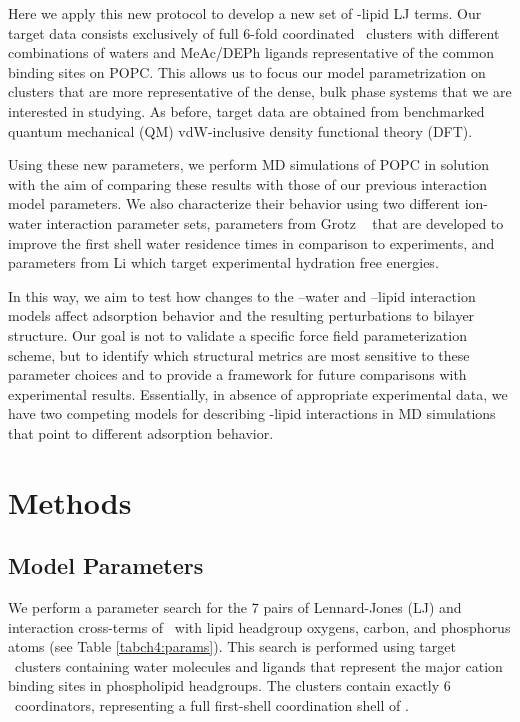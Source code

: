 Here we apply this new protocol to develop a new set of \mg{}-lipid LJ
terms. Our target data consists exclusively of full 6-fold coordinated \mg~clusters with 
different combinations of waters and MeAc/DEPh ligands representative of the common binding sites on POPC.
This allows us to focus our model parametrization on clusters that are more representative of the dense, bulk phase systems that we are interested in studying. 
As before, target data are obtained from benchmarked quantum mechanical (QM) vdW-inclusive density functional theory (DFT).

Using these new parameters, we perform MD simulations of POPC in \mgcl{} solution with the aim of comparing these results
with those of our previous interaction model parameters. We also characterize their behavior using two different
ion-water interaction parameter sets, parameters from Grotz \etal~\cite{grotz:2021:optimized,micro} that are developed to
improve the first shell water residence times in comparison to experiments, and parameters from Li
\etal{}\cite{merzhfe} which target experimental hydration free energies.

In this way, we aim to test how changes to the \mg–water and \mg–lipid interaction models affect adsorption behavior and
the resulting perturbations to bilayer structure. Our goal is not to validate a specific force field parameterization scheme,
but to identify which structural metrics are most sensitive to these parameter choices and to provide a framework for future
comparisons with experimental results. 
Essentially, in absence of appropriate experimental data, we have two competing models for describing \mg-lipid interactions
in MD simulations that point to different adsorption behavior.

\section{Methods}
\subsection{\mg{} Model Parameters}

We perform a parameter search for the 7 pairs of Lennard-Jones (LJ) \sigmaij{} and \epsilonij{} interaction
cross-terms of \mg~with lipid headgroup oxygens, carbon, and phosphorus atoms (see Table \ref{tabch4:params}). 
This search is performed using target 
\mg~clusters containing water molecules and ligands that represent the major cation binding sites in phospholipid headgroups. 
The clusters contain exactly 6 \mg~coordinators, representing a full first-shell coordination shell of \mg.


